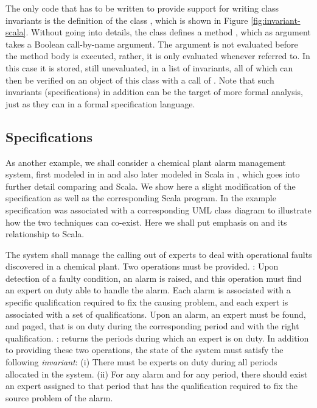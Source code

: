 The only code that has to be written to provide support for 
writing
class invariants is the definition of the class , 
which is shown in Figure \ref{fig:invariant-scala}. Without going 
into details, the class defines a method ,
which as argument takes a Boolean call-by-name argument. 
The argument is not evaluated before the method body is executed, 
rather, it is only evaluated whenever referred to. In this case
it is stored, still unevaluated, in a list of invariants, all
of which can then be verified on an object of this class 
with a call of . Note that such invariants
(specifications) in addition can be the target of more formal analysis, just as they can in a formal specification language.


\subsection{\vdmpp{} Specifications}
\label{sec:vdm-in-scala}

As another example, we shall consider a chemical plant alarm 
management system, first modeled in \vdmpp{} in 
\cite{vdmplusplus05} and also later modeled in Scala in 
\cite{havelund-scala-vdm-12}, which goes into further detail comparing \vdmpp{} and Scala. We show here a slight modification of 
the \vdmpp{} specification as well as the 
corresponding Scala program. In \cite{vdmplusplus05}
the example specification was associated with 
a corresponding UML class diagram to illustrate how the two
techniques can co-exist. Here we shall put emphasis on
\vdmpp{} and its relationship to Scala.

The system shall manage the calling out of experts to deal with 
operational faults discovered in a 
chemical plant. 
Two operations must be provided.
: Upon detection of a faulty condition, an 
alarm is raised, and this operation must find an expert on duty 
able to handle the alarm. Each alarm is associated with a specific 
qualification required to fix the causing
problem, and each expert is associated with a set of 
qualifications. Upon an alarm, an expert must be found, and paged, 
that is on duty during the corresponding period and with the right 
qualification.    
: returns the periods during 
which an expert is on duty.      
In addition to providing these two operations, the state of the 
system must satisfy the following
{\em invariant}:
(i) There must be experts on duty during all periods 
allocated in the system. 
(ii) For any alarm and for any period, there should exist an 
expert assigned to that period that has the qualification required
to fix the source problem of the alarm.

